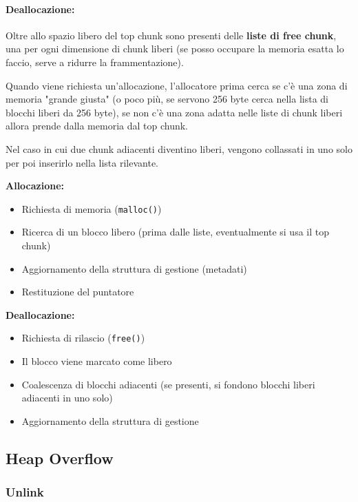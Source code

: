 \paragraph{Deallocazione:} Oltre allo spazio libero del top chunk sono presenti delle \textbf{liste di free chunk}, una per ogni dimensione di chunk liberi (se posso occupare la memoria esatta lo faccio, serve a ridurre la frammentazione). 

Quando viene richiesta un'allocazione, l'allocatore prima cerca se c'è una zona di memoria "grande giusta" (o poco più, se servono 256 byte cerca nella lista di blocchi liberi da 256 byte), se non c'è una zona adatta nelle liste di chunk liberi allora prende dalla memoria dal top chunk.

Nel caso in cui due chunk adiacenti diventino liberi, vengono collassati in uno solo per poi inserirlo nella lista rilevante.

\vfill

\begin{minipage}{0.43\textwidth}
	\textbf{Allocazione:}
	\begin{itemize}
		\item Richiesta di memoria (\texttt{malloc()})
		\item Ricerca di un blocco libero (prima dalle liste, eventualmente si usa il top chunk)
		\item Aggiornamento della struttura di gestione (metadati)
		\item Restituzione del puntatore
	\end{itemize}
\end{minipage}
\hfill
\begin{minipage}{0.43\textwidth}
	\textbf{Deallocazione:}
	\begin{itemize}
		\item Richiesta di rilascio (\texttt{free()})
		\item Il blocco viene marcato come libero 
		\item Coalescenza di blocchi adiacenti (se presenti, si fondono blocchi liberi adiacenti in uno solo)
		\item Aggiornamento della struttura di gestione
	\end{itemize}
\end{minipage}

\subsection{Heap Overflow}

\subsubsection{Unlink}

